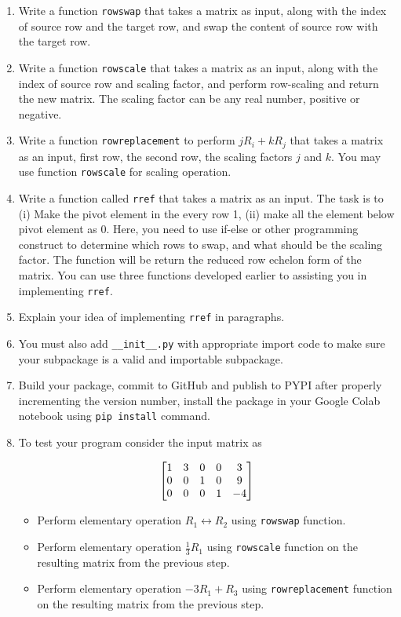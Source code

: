 \documentclass[12pt, xcolor=dvipsnames,svgnames,x11names]{article}
\makeatletter
\newenvironment{multiequation}[1][]{%
\begin{equation}%
   \begin{aligned}%
   \ifx#1\@empty\else\label{#1}\fi%
}{%
   \end{aligned}%
\end{equation}%
}
\makeatother
\begin{document}
\begin{enumerate}
   \item Write a function \texttt{rowswap} that takes a matrix as input, along with the index of source row and the target row, and swap the content of source row with the target row.
   \item Write a function \texttt{rowscale} that takes a matrix as an input, along with the index of source row and scaling factor, and perform row-scaling and return the new matrix. The scaling factor can be any real number, positive or negative.
   \item Write a function \texttt{rowreplacement} to perform $jR_i + kR_j$ that takes a matrix as an input, first row, the second row, the scaling factors $j$ and $k$. You may use function \texttt{rowscale} for scaling operation.
   \item Write a function called \texttt{rref} that takes a matrix as an input. The task is to (i) Make the pivot element in the every row 1, (ii) make all the element below pivot element as 0. Here, you need to use if-else or other programming construct to determine which rows to swap, and what should be the scaling factor. The function will be return the reduced row echelon form of the matrix. You can use three functions developed earlier to assisting you in implementing \texttt{rref}.
   \item Explain your idea of implementing \texttt{rref} in paragraphs.
   \item You must also add \texttt{\_\_init\_\_.py} with appropriate import code to make sure your subpackage is a valid and importable subpackage.
   \item Build your package, commit to GitHub and publish to PYPI after properly incrementing the version number, install the package in your Google Colab notebook using \texttt{pip install} command.
   \item To test your program consider the input matrix as 
   
   \begin{multiequation}
      \begin{bmatrix}
      1 & 3 & 0 & 0 & 3\\
      0 & 0 & 1 & 0 & 9\\
      0 & 0 & 0 & 1 & -4
   \end{bmatrix}
   \end{multiequation}

   \begin{itemize}
      \item Perform elementary operation $R_1 \leftrightarrow  R_2$  using \texttt{rowswap} function.
      \item Perform elementary operation $\frac{1}{3}R_1$  using \texttt{rowscale} function on the resulting matrix from the previous step.
      \item Perform elementary operation $-3R_1 + R_3$  using \texttt{rowreplacement} function on the resulting matrix from the previous step.
   \end{itemize}
\end{enumerate}
\end{document}
